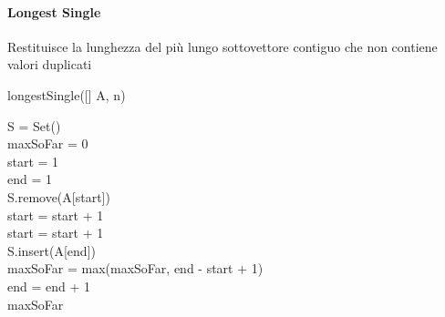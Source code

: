 \documentclass[../../notes.tex]{subfiles}
\begin{document}
  \paragraph{Longest Single} Restituisce la lunghezza del più lungo sottovettore contiguo che non contiene valori duplicati

  \begin{algorithm}[H]
    \NoCaptionOfAlgo
    \caption{ longestSingle([] A,  n)}
     S = Set()\\
     maxSoFar = 0\\
     start = 1\\
     end = 1\\
     {
       {
         {
          S.remove(A[start])\\
          start = start + 1\\
        }
        start = start + 1\\
      } {
        S.insert(A[end])\\
        maxSoFar = max(maxSoFar, end - start + 1)\\
      }
      end = end + 1\\
    }
     maxSoFar\\
  \end{algorithm}
\end{document}
